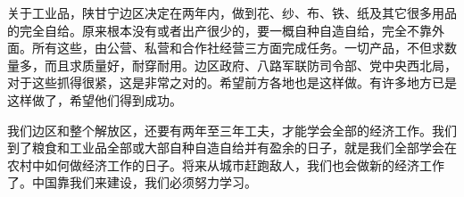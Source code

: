 关于工业品，陕甘宁边区决定在两年内，做到花、纱、布、铁、纸及其它很多用品的完全自给。原来根本没有或者出产很少的，要一概自种自造自给，完全不靠外面。所有这些，由公营、私营和合作社经营三方面完成任务。一切产品，不但求数量多，而且求质量好，耐穿耐用。边区政府、八路军联防司令部、党中央西北局，对于这些抓得很紧，这是非常之对的。希望前方各地也是这样做。有许多地方已是这样做了，希望他们得到成功。

我们边区和整个解放区，还要有两年至三年工夫，才能学会全部的经济工作。我们到了粮食和工业品全部或大部自种自造自给并有盈余的日子，就是我们全部学会在农村中如何做经济工作的日子。将来从城市赶跑敌人，我们也会做新的经济工作了。中国靠我们来建设，我们必须努力学习。
